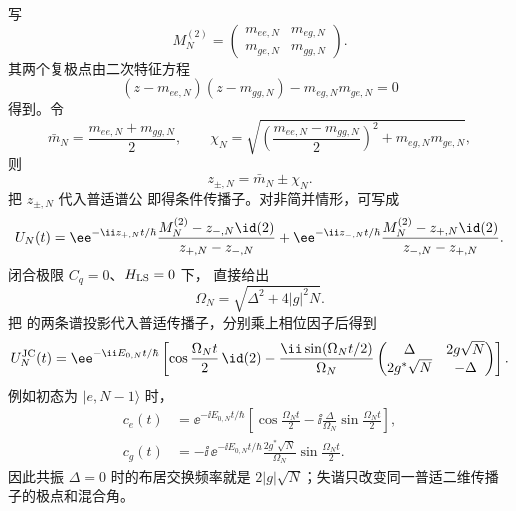 写
\[
M_N^{(2)}=
\begin{pmatrix}
m_{ee,N}&m_{eg,N}\\
m_{ge,N}&m_{gg,N}
\end{pmatrix}.
\]
其两个复极点由二次特征方程
\[
(z-m_{ee,N})(z-m_{gg,N})-m_{eg,N}m_{ge,N}=0
\]
得到。令
\[
\bar m_N=\frac{m_{ee,N}+m_{gg,N}}2,
\qquad
\chi_N=\sqrt{\left(\frac{m_{ee,N}-m_{gg,N}}2\right)^2+m_{eg,N}m_{ge,N}},
\]
则
\[
z_{\pm,N}=\bar m_N\pm\chi_N.
\]
把 $z_{\pm,N}$ 代入普适谱公 即得条件传播子。对非简并情形，可写成
\[
U_N(t)=\ee^{-\ii z_{+,N}t/\hbar}
\frac{M_N^{(2)}-z_{-,N}\id(2)}{z_{+,N}-z_{-,N}}
+\ee^{-\ii z_{-,N}t/\hbar}
\frac{M_N^{(2)}-z_{+,N}\id(2)}{z_{-,N}-z_{+,N}}.
\]
闭合极限 $C_q=0$、$H_{\rm LS}=0$ 下， 直接给出
\begin{equation}
\Omega_N=\sqrt{\Delta^2+4|g|^2N}.
\label{eq:phys-oqs-jc-generalized-rabi}
\end{equation}
把 的两条谱投影代入普适传播子，分别乘上相位因子后得到
\begin{equation}
U_N^{\rm JC}(t)
=\ee^{-\ii E_{0,N}t/\hbar}
\left[
\cos\frac{\Omega_Nt}{2}\,\id(2)
-\frac{\ii\sin(\Omega_Nt/2)}{\Omega_N}
\begin{pmatrix}
\Delta&2g\sqrt N\\
2g^*\sqrt N&-\Delta
\end{pmatrix}
\right].
\label{eq:phys-oqs-jc-propagator}
\end{equation}
例如初态为 $|e,N-1\rangle$ 时，
\begin{align}
c_e(t)
&=\ee^{-\ii E_{0,N}t/\hbar}
\left[\cos\frac{\Omega_Nt}{2}
-\ii\frac{\Delta}{\Omega_N}\sin\frac{\Omega_Nt}{2}\right],\\
c_g(t)
&=-\ii\,\ee^{-\ii E_{0,N}t/\hbar}
\frac{2g^*\sqrt N}{\Omega_N}
\sin\frac{\Omega_Nt}{2}.
\end{align}
因此共振 $\Delta=0$ 时的布居交换频率就是 $2|g|\sqrt N$；失谐只改变同一普适二维传播子的极点和混合角。

